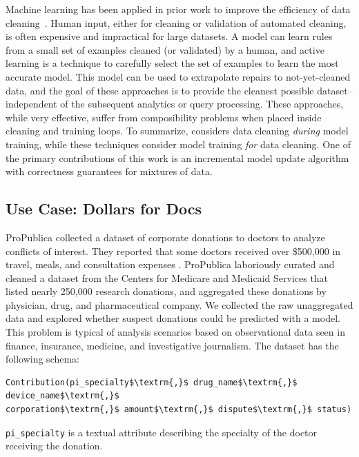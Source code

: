 Machine learning has been applied in prior work to improve the efficiency of data cleaning~\cite{yakout2013don,DBLP:journals/pvldb/YakoutENOI11,gokhale2014corleone}.
Human input, either for cleaning or validation of automated cleaning, is often expensive and impractical for large datasets.
A model can learn rules from a small set of examples cleaned (or validated) by a human, and active learning is a technique to carefully select the set of examples to learn the most accurate model.
This model can be used to extrapolate repairs to not-yet-cleaned data, and the goal of these approaches is to provide the cleanest possible dataset--independent of the subsequent analytics or query processing.
These approaches, while very effective, suffer from composibility problems when placed inside cleaning and training loops.
To summarize, \sys considers data cleaning \emph{during} model training, while these techniques consider model training \emph{for} data cleaning.
One of the primary contributions of this work is an incremental model update algorithm with correctness guarantees for mixtures of data.

\subsection{Use Case: Dollars for Docs \cite{dollarsfordocs}}\label{s:usecase}
ProPublica collected a dataset of corporate donations to doctors to analyze conflicts of interest. 
They reported that some doctors received over \$500,000 in travel, meals, and consultation expenses \cite{dollarsfordocsa}.
ProPublica laboriously curated and cleaned a dataset from the Centers for Medicare and Medicaid Services that listed nearly 250,000 research donations, and aggregated these donations by physician, drug, and pharmaceutical company.
We collected the raw unaggregated data and explored whether suspect donations could be predicted with a model.
This problem is typical of analysis scenarios based on observational data seen in finance, insurance, medicine, and investigative journalism.
The dataset has the following schema:
\begin{lstlisting}[mathescape,basicstyle={\scriptsize}]
Contribution(pi_specialty$\textrm{,}$ drug_name$\textrm{,}$ device_name$\textrm{,}$
corporation$\textrm{,}$ amount$\textrm{,}$ dispute$\textrm{,}$ status)
\end{lstlisting}

\noindent\texttt{pi\_specialty} is a textual attribute describing the specialty of the doctor receiving the donation.

